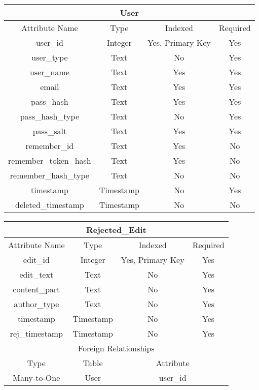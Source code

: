 \documentclass[12pt,letterpaper]{article}
\begin{document}
\vspace{.6cm}
\begin{center}
\label{User}
\begin{tabular}{|c|c|c|c|}
\hline
\multicolumn{4}{|c|}{User} \\ \hline
Attribute Name & Type & Indexed & Required \\ \hline
user\_id & Integer & Yes, Primary Key & Yes \\ \hline
user\_type & Text & No & Yes \\ \hline	%
user\_name & Text & Yes & Yes \\ \hline
email & Text & Yes & Yes \\ \hline
pass\_hash & Text & Yes & Yes \\ \hline
pass\_hash\_type & Text & No & Yes \\ \hline
pass\_salt & Text & Yes & Yes \\ \hline
remember\_id & Text & Yes & No \\ \hline
remember\_token\_hash & Text & Yes & No \\ \hline
remember\_hash\_type & Text & No & No \\ \hline
timestamp & Timestamp & No & Yes \\ \hline
deleted\_timestamp & Timestamp & No & No \\ \hline
\end{tabular}
\end{center}


\begin{center}
\label{RejectedEdit}
\begin{tabular}{|c|c|c|c|}
\hline
\multicolumn{4}{|c|}{Rejected\_Edit} \\ \hline
Attribute Name & Type & Indexed & Required \\ \hline
edit\_id & Integer & Yes, Primary Key & Yes \\ \hline
edit\_text & Text & No & Yes \\ \hline
content\_part & Text & No & Yes \\ \hline
author\_type & Text & No & Yes \\ \hline %
timestamp & Timestamp & No & Yes \\ \hline
rej\_timestamp & Timestamp & No & Yes \\ \hline
\multicolumn{4}{|c|}{Foreign Relationships} \\ \hline
Type & Table & \multicolumn{2}{c|}{Attribute} \\ \hline
Many-to-One & User & \multicolumn{2}{c|}{user\_id} \\ \hline %
\end{tabular}
\end{center}
\end{document}
